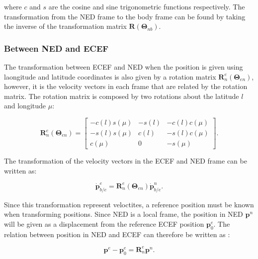 where $c$ and $s$ are the cosine and sine trigonometric functions respectively. The transformation from the NED frame to the body frame can be found by taking the inverse of the transformation matrix $\mathbf{R}(\bm{\Theta}_{nb})$.

\subsubsection{Between NED and ECEF}

The transformation between ECEF and NED when the position is given using laongitude and latitude coordinates is also given by a rotation matrix $\mathbf{R}_n^e(\bm{\Theta}_{en})$, however, it is the velocity vectors in each frame that are related by the rotation matrix. The rotation matrix is composed by two rotations about the latitude $l$ and longitude $\mu$:

\begin{equation}
	\mathbf{R}_n^e(\bm{\Theta}_{en}) =
	\begin{bmatrix}
		-c(l)s(\mu) & -s(l) & -c(l)c(\mu) \\
		-s(l)s(\mu) & c(l) & -s(l)c(\mu) \\
		c(\mu) & 0 & -s(\mu)
	\end{bmatrix}.
\end{equation}

The transformation of the velocity vectors in the ECEF and NED frame can be written as:

\begin{equation}
	\mathbf{\dot{p}}_{b/e}^e = \mathbf{R}_n^e(\bm{\Theta}_{en})\mathbf{\dot{p}}_{b/e}^n.
\end{equation}

Since this transformation represent veloctites, a reference position must be known when transforming positions. Since NED is a local frame, the position in NED $\mathbf{p}^n$ will be given as a displacement from the reference ECEF position $\mathbf{p}_0^e$. The relation between position in NED and ECEF can therefore be written as \cite{ROTATION}:

\begin{equation}
	\mathbf{p}^e - \mathbf{p}_0^e = \mathbf{R}_n^e \mathbf{p}^n.
\end{equation} 